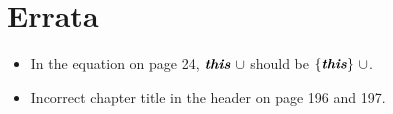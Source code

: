 \documentclass[letterpaper,12pt]{article}
\begin{document}
\thispagestyle{empty}
\section*{Errata}
\begin{itemize}
  \item In the equation on page 24, $\textbf{\emph{this}}~\cup$ should be $\{ \textbf{\emph{this}} \}~\cup$.
  \item Incorrect chapter title in the header on page 196 and 197.
\end{itemize}
\end{document}
